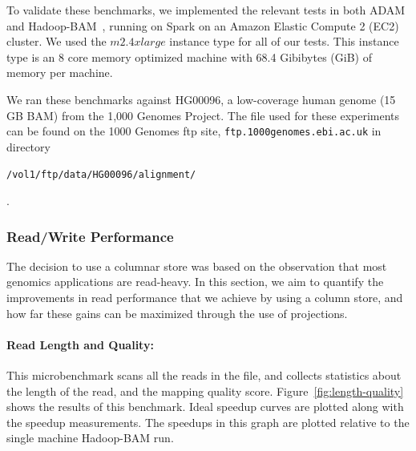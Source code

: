\documentclass[10pt,twocolumn]{article}
\theoremstyle{plain}
\begin{document}
To validate these benchmarks, we implemented
the relevant tests in both ADAM and Hadoop-BAM~\cite{niemenmaa12}, running on Spark on an Amazon Elastic Compute 2 (EC2)
cluster. We used the $m2.4xlarge$ instance type for all of our tests. This instance type is an 8 core memory optimized machine
with 68.4 Gibibytes (GiB) of memory per machine. 

We ran these benchmarks against HG00096, a low-coverage human genome (15 GB
BAM) from the 1,000 Genomes Project. The file used for these experiments can be found on the 1000 Genomes ftp site, \texttt{ftp.1000genomes.ebi.ac.uk} in directory 
\begin{small}\texttt{/vol1/ftp/data/HG00096/alignment/}\end{small}.

\subsubsection{Read/Write Performance}
\label{sec:read-write-performance}

The decision to use a columnar store was based on the observation that most genomics applications are read-heavy. In this section,
we aim to quantify the improvements in read performance that we achieve by using a column store, and how far these gains can be
maximized through the use of projections.

\paragraph{Read Length and Quality:}
\label{sec:read-length-and-quality}

This microbenchmark scans all the reads in the file, and collects statistics about the length of the read, and the mapping quality score. Figure~\ref{fig:length-quality} shows
the results of this benchmark. Ideal speedup curves are plotted along with the speedup measurements. The speedups in this graph are plotted relative to the single machine Hadoop-BAM run.
\end{document}

